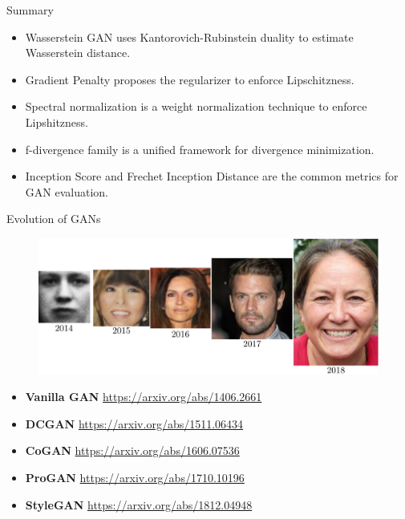 \begin{frame}{Summary}
	\begin{itemize}
		\item Wasserstein GAN uses Kantorovich-Rubinstein duality to estimate Wasserstein distance.
		\item Gradient Penalty proposes the regularizer to enforce Lipschitzness.
		\item Spectral normalization is a weight normalization technique to enforce Lipshitzness.
		\item f-divergence family is a unified framework for divergence minimization.
		\item Inception Score and Frechet Inception Distance are the common metrics for GAN evaluation.
	\end{itemize}
\end{frame}
\begin{frame}{Evolution of GANs}
	\begin{figure}
		\centering
		\includegraphics[width=\linewidth]{figs/gan_evolution}
	\end{figure}
	\begin{itemize}
		\item \textbf{Vanilla GAN} \href{https://arxiv.org/abs/1406.2661}{https://arxiv.org/abs/1406.2661}
		\item \textbf{DCGAN} \href{https://arxiv.org/abs/1511.06434}{https://arxiv.org/abs/1511.06434}
		\item \textbf{CoGAN} \href{https://arxiv.org/abs/1606.07536}{https://arxiv.org/abs/1606.07536}
		\item \textbf{ProGAN} \href{https://arxiv.org/abs/1710.10196}{https://arxiv.org/abs/1710.10196} 
		\item \textbf{StyleGAN} \href{https://arxiv.org/abs/1812.04948}{https://arxiv.org/abs/1812.04948}
	\end{itemize}
\end{frame}
